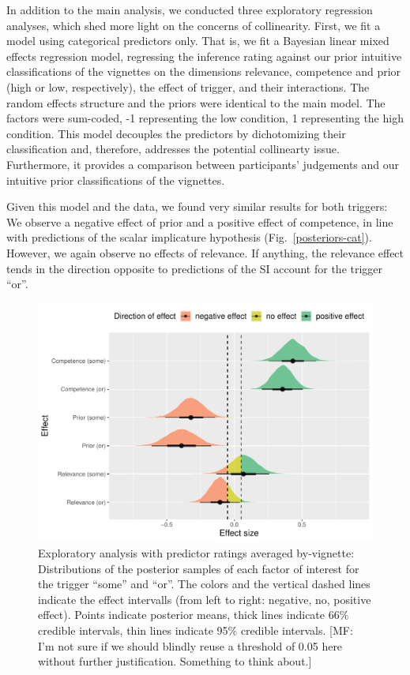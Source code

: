 \documentclass{sp}
\newcommand{\mf}[1]{\textcolor{BurntOrange}{[MF: #1]}}
\begin{document}
In addition to the main analysis, we conducted three exploratory regression analyses, which shed more light on the concerns of collinearity. First, we fit a model using categorical predictors only. That is, we fit a Bayesian linear mixed effects regression model, regressing the inference rating against our prior intuitive classifications of the vignettes on the dimensions relevance, competence and prior (high or low, respectively), the effect of trigger, and their interactions. The random effects structure and the priors were identical to the main model. The factors were sum-coded, -1 representing the low condition, 1 representing the high condition.
This model decouples the predictors by dichotomizing their classification and, therefore, addresses the potential collinearty issue. Furthermore, it provides a comparison between participants' judgements and our intuitive prior classifications of the vignettes. 

Given this model and the data, we found very similar results for both triggers: We observe a negative effect of prior and a positive effect of competence, in line with predictions of the scalar implicature hypothesis (Fig.~\ref{posteriors-cat}). However, we again observe no effects of relevance. If anything, the relevance effect tends in the direction opposite to predictions of the SI account for the trigger ``or''. 

\begin{figure}[h]
	\begin{center}
		\includegraphics[width=1\linewidth]{images/posterior-effects-means.pdf}
	\end{center}
	\vspace{-0.3cm}
	\caption{Exploratory analysis with predictor ratings averaged by-vignette: Distributions of the posterior samples of each factor of interest for the trigger ``some'' and ``or''. The colors and the vertical dashed lines indicate the effect intervalls (from left to right: negative, no, positive effect). Points indicate posterior means, thick lines indicate 66\% credible intervals, thin lines indicate 95\% credible intervals. \mf{I'm not sure if we should blindly reuse a threshold of 0.05 here without further justification. Something to think about.}}
	\label{posteriors-mean}
\end{figure}
\end{document}
